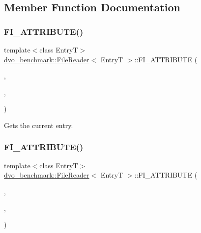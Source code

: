 \subsection{Member Function Documentation}
\mbox{\label{classdvo__benchmark_1_1_file_reader_af0c136260af17b315ec2761dd647e5e1}} 
\subsubsection{\texorpdfstring{F\+I\+\_\+\+A\+T\+T\+R\+I\+B\+U\+T\+E()}{FI\_ATTRIBUTE()}\hspace{0.1cm}{\footnotesize\ttfamily [1/2]}}
{\footnotesize\ttfamily template$<$class EntryT$>$ \\
\mbox{\hyperlink{classdvo__benchmark_1_1_file_reader}{dvo\+\_\+benchmark\+::\+File\+Reader}}$<$ EntryT $>$\+::F\+I\+\_\+\+A\+T\+T\+R\+I\+B\+U\+TE (\begin{DoxyParamCaption}\item[{\mbox{\hyperlink{classdvo__benchmark_1_1_file_reader}{File\+Reader}}$<$ EntryT $>$}]{,  }\item[{EntryT}]{,  }\item[{entry}]{ }\end{DoxyParamCaption})}

Gets the current entry. \mbox{\label{classdvo__benchmark_1_1_file_reader_ab929f48570b38a74293fae46a6dfce2d}} 
\subsubsection{\texorpdfstring{F\+I\+\_\+\+A\+T\+T\+R\+I\+B\+U\+T\+E()}{FI\_ATTRIBUTE()}\hspace{0.1cm}{\footnotesize\ttfamily [2/2]}}
{\footnotesize\ttfamily template$<$class EntryT$>$ \\
\mbox{\hyperlink{classdvo__benchmark_1_1_file_reader}{dvo\+\_\+benchmark\+::\+File\+Reader}}$<$ EntryT $>$\+::F\+I\+\_\+\+A\+T\+T\+R\+I\+B\+U\+TE (\begin{DoxyParamCaption}\item[{\mbox{\hyperlink{classdvo__benchmark_1_1_file_reader}{File\+Reader}}$<$ EntryT $>$}]{,  }\item[{bool}]{,  }\item[{has\+Entry}]{ }\end{DoxyParamCaption})}

